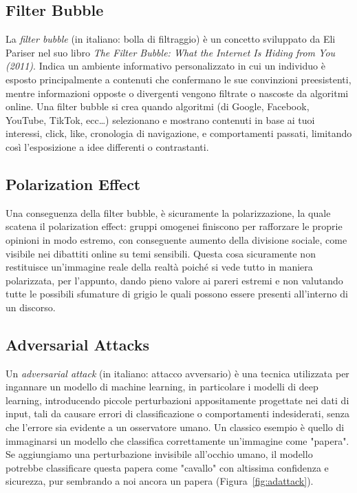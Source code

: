 \subsection{Filter Bubble}
La \textit{filter bubble} (in italiano: bolla di filtraggio) è un concetto sviluppato da Eli Pariser nel suo libro \textit{The Filter Bubble: What the Internet Is Hiding from You (2011)}. Indica un ambiente informativo personalizzato in cui un individuo è esposto principalmente a contenuti che confermano le sue convinzioni preesistenti, mentre informazioni opposte o divergenti vengono filtrate o nascoste da algoritmi online. Una filter bubble si crea quando algoritmi (di Google, Facebook, YouTube, TikTok, ecc\dots) selezionano e mostrano contenuti in base ai tuoi interessi, click, like, cronologia di navigazione, e comportamenti passati, limitando così l’esposizione a idee differenti o contrastanti.

\subsection{Polarization Effect}

Una conseguenza della filter bubble, è sicuramente la polarizzazione, la quale scatena il polarization effect: gruppi omogenei finiscono per rafforzare le proprie opinioni in modo estremo, con conseguente aumento della divisione sociale, come visibile nei dibattiti online su temi sensibili. Questa cosa sicuramente non restituisce un'immagine reale della realtà poiché si vede tutto in maniera polarizzata, per l'appunto, dando pieno valore ai pareri estremi e non valutando tutte le possibili sfumature di grigio le quali possono essere presenti all'interno di un discorso.

\subsection{Adversarial Attacks}

Un \textit{adversarial attack} (in italiano: attacco avversario) è una tecnica utilizzata per ingannare un modello di machine learning, in particolare i modelli di deep learning, introducendo piccole perturbazioni appositamente progettate nei dati di input, tali da causare errori di classificazione o comportamenti indesiderati, senza che l’errore sia evidente a un osservatore umano. Un classico esempio è quello di immaginarsi un modello che classifica correttamente un’immagine come "papera". Se aggiungiamo una perturbazione invisibile all’occhio umano, il modello potrebbe classificare questa papera come "cavallo" con altissima confidenza e sicurezza, pur sembrando a noi ancora un papera (Figura~\ref{fig:adattack}).

